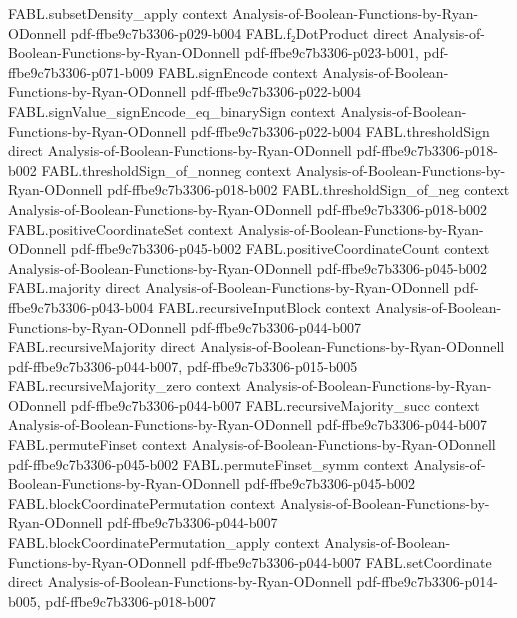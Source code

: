 \begin{theorem}
  {FABL.subsetDensity_apply}
  {context}
  {Analysis-of-Boolean-Functions-by-Ryan-ODonnell}
  {pdf-ffbe9c7b3306-p029-b004}
\proofstep
  {FABL.f₂DotProduct}
  {direct}
  {Analysis-of-Boolean-Functions-by-Ryan-ODonnell}
  {pdf-ffbe9c7b3306-p023-b001,
    pdf-ffbe9c7b3306-p071-b009}
\proofstep
  {FABL.signEncode}
  {context}
  {Analysis-of-Boolean-Functions-by-Ryan-ODonnell}
  {pdf-ffbe9c7b3306-p022-b004}
\proofstep
  {FABL.signValue_signEncode_eq_binarySign}
  {context}
  {Analysis-of-Boolean-Functions-by-Ryan-ODonnell}
  {pdf-ffbe9c7b3306-p022-b004}
\proofstep
  {FABL.thresholdSign}
  {direct}
  {Analysis-of-Boolean-Functions-by-Ryan-ODonnell}
  {pdf-ffbe9c7b3306-p018-b002}
\proofstep
  {FABL.thresholdSign_of_nonneg}
  {context}
  {Analysis-of-Boolean-Functions-by-Ryan-ODonnell}
  {pdf-ffbe9c7b3306-p018-b002}
\proofstep
  {FABL.thresholdSign_of_neg}
  {context}
  {Analysis-of-Boolean-Functions-by-Ryan-ODonnell}
  {pdf-ffbe9c7b3306-p018-b002}
\proofstep
  {FABL.positiveCoordinateSet}
  {context}
  {Analysis-of-Boolean-Functions-by-Ryan-ODonnell}
  {pdf-ffbe9c7b3306-p045-b002}
\proofstep
  {FABL.positiveCoordinateCount}
  {context}
  {Analysis-of-Boolean-Functions-by-Ryan-ODonnell}
  {pdf-ffbe9c7b3306-p045-b002}
\proofstep
  {FABL.majority}
  {direct}
  {Analysis-of-Boolean-Functions-by-Ryan-ODonnell}
  {pdf-ffbe9c7b3306-p043-b004}
\proofstep
  {FABL.recursiveInputBlock}
  {context}
  {Analysis-of-Boolean-Functions-by-Ryan-ODonnell}
  {pdf-ffbe9c7b3306-p044-b007}
\proofstep
  {FABL.recursiveMajority}
  {direct}
  {Analysis-of-Boolean-Functions-by-Ryan-ODonnell}
  {pdf-ffbe9c7b3306-p044-b007,
    pdf-ffbe9c7b3306-p015-b005}
\proofstep
  {FABL.recursiveMajority_zero}
  {context}
  {Analysis-of-Boolean-Functions-by-Ryan-ODonnell}
  {pdf-ffbe9c7b3306-p044-b007}
\proofstep
  {FABL.recursiveMajority_succ}
  {context}
  {Analysis-of-Boolean-Functions-by-Ryan-ODonnell}
  {pdf-ffbe9c7b3306-p044-b007}
\proofstep
  {FABL.permuteFinset}
  {context}
  {Analysis-of-Boolean-Functions-by-Ryan-ODonnell}
  {pdf-ffbe9c7b3306-p045-b002}
\proofstep
  {FABL.permuteFinset_symm}
  {context}
  {Analysis-of-Boolean-Functions-by-Ryan-ODonnell}
  {pdf-ffbe9c7b3306-p045-b002}
\proofstep
  {FABL.blockCoordinatePermutation}
  {context}
  {Analysis-of-Boolean-Functions-by-Ryan-ODonnell}
  {pdf-ffbe9c7b3306-p044-b007}
\proofstep
  {FABL.blockCoordinatePermutation_apply}
  {context}
  {Analysis-of-Boolean-Functions-by-Ryan-ODonnell}
  {pdf-ffbe9c7b3306-p044-b007}
\proofstep
  {FABL.setCoordinate}
  {direct}
  {Analysis-of-Boolean-Functions-by-Ryan-ODonnell}
  {pdf-ffbe9c7b3306-p014-b005,
    pdf-ffbe9c7b3306-p018-b007}

\end{theorem}
